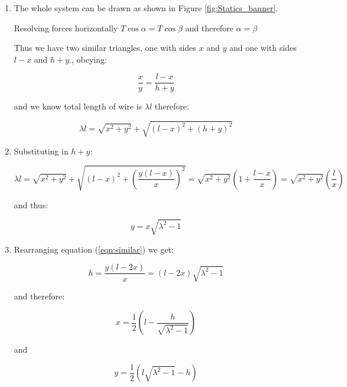 \begin{problem}
{\begin{enumerate}
	\item The whole system can be drawn as shown in Figure \ref{fig:Statics_banner}.
	
	Resolving forces horizontally $T \cos\alpha = T \cos\beta$ and therefore $\alpha = \beta$
	
	Thus we have two similar triangles, one with sides $x$ and $y$ and one with sides $l - x$  and  $h + y$., obeying:
	
	\begin{equation}	\frac{x}{y} = \frac{l - x}{h + y}	
	\label{eqn:similar}
	\end{equation}
	
	and we know total length of wire is $\lambda l$ therefore:
	
	\begin{equation}	\lambda l = \sqrt{x^{2} + y^{2}} + \sqrt{{(l - x)}^{2} + {(h + y)}^{2}}  \end{equation}
	
	 \item Substituting in $h + y$:
	 
	 \begin{equation*}	\lambda l = \sqrt{x^{2} + y^{2}} + \sqrt{{(l - x)}^{2} + \left({\frac{y(l-x)}{x}}\right)^{2}} 
	 = \sqrt{x^{2} + y^{2}} \left( 1 + \frac{l-x}{x} \right)
	 = \sqrt{x^{2} + y^{2}} \left(\frac{l}{x} \right)\end{equation*}
	 
	 and thus:
	 
	 \begin{equation}	y = x \sqrt{\lambda^2 - 1} 
	 \label{eqn:yx} \end{equation}
	 
	 \item Rearranging equation (\ref{eqn:similar}) we get:
	 
	  \begin{equation*}	h = \frac{y(l - 2x)}{x} =  (l - 2x)\sqrt{\lambda^2 - 1}   \end{equation*}
	  
	  and therefore:
	  
	   \begin{equation}	x = \frac{1}{2} \left(  l - \frac{h}{\sqrt{\lambda^2 -1}} \right)  \end{equation}
	   
	   and
	  
	   \begin{equation}	y = \frac{1}{2}( l\sqrt{\lambda^2 - 1} - h)  \end{equation}
	   

\end{enumerate}}
\end{problem}
